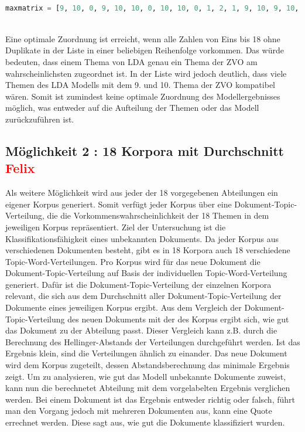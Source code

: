 \documentclass[german,version-2020-11]{uzl-thesis}
\begin{document}
\\

\begin{lstlisting}[language=Python]
maxmatrix = [9, 10, 0, 9, 10, 10, 0, 10, 10, 0, 1, 2, 1, 9, 10, 9, 10, 9]
\end{lstlisting}

\\
Eine optimale Zuordnung ist erreicht, wenn alle Zahlen von Eins bis 18 ohne Duplikate in der Liste in einer beliebigen Reihenfolge vorkommen. Das würde bedeuten, dass einem Thema von LDA genau ein Thema der ZVO am wahrscheinlichsten zugeordnet ist. In der Liste wird jedoch deutlich, dass viele Themen des LDA Modells mit dem 9. und 10. Thema der ZVO kompatibel wären. Somit ist zumindest keine optimale Zuordnung des Modellergebnisses möglich, was entweder auf die Aufteilung der Themen oder das Modell zurückzuführen ist.

\subsection{Möglichkeit 2 : 18 Korpora mit Durchschnitt \textcolor{red}{Felix}}
Als weitere Möglichkeit wird aus jeder der 18 vorgegebenen Abteilungen ein eigener Korpus generiert. Somit verfügt jeder Korpus über eine Dokument-Topic-Verteilung, die die Vorkommenswahrscheinlichkeit der 18 Themen in dem jeweiligen Korpus repräsentiert. Ziel der Untersuchung ist die Klassifikationsfähigkeit eines unbekannten Dokuments. Da jeder Korpus aus verschiedenen Dokumenten besteht, gibt es in 18 Korpora auch 18 verschiedene Topic-Word-Verteilungen. Pro Korpus wird für das neue Dokument die Dokument-Topic-Verteilung auf Basis der individuellen Topic-Word-Verteilung generiert. Dafür ist die Dokument-Topic-Verteilung der einzelnen Korpora relevant, die sich aus dem Durchschnitt aller Dokument-Topic-Verteilung der Dokumente eines jeweiligen Korpus ergibt. Aus dem Vergleich der Dokument-Topic-Verteilung des neuen Dokuments mit der des Korpus ergibt sich, wie gut das Dokument zu der Abteilung passt. Dieser Vergleich kann z.B. durch die Berechnung des Hellinger-Abstands der Verteilungen durchgeführt werden. Ist das Ergebnis klein, sind die Verteilungen ähnlich zu einander. Das neue Dokument wird dem Korpus zugeteilt, dessen Abstandsberechnung das minimale Ergebnis zeigt. Um zu analysieren, wie gut das Modell unbekannte Dokumente zuweist, kann nun die berechnetet Abteilung mit dem vorgelabelten Ergebnis verglichen werden. Bei einem Dokument ist das Ergebnis entweder richtig oder falsch, führt man den Vorgang jedoch mit mehreren Dokumenten aus, kann eine Quote errechnet werden. Diese sagt aus, wie gut die Dokumente klassifiziert wurden. 
\end{document}
